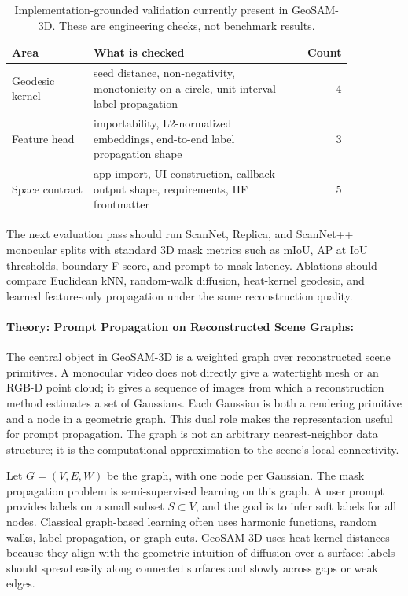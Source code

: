 \documentclass{article}
\begin{document}
\begin{table}[t]
\centering
\caption{Implementation-grounded validation currently present in GeoSAM-3D. These are engineering checks, not benchmark results.}
\label{tab:validation}
\begin{tabular}{@{}p{0.24\linewidth}p{0.62\linewidth}r@{}}
\toprule
\textbf{Area} & \textbf{What is checked} & \textbf{Count}\\
\midrule
Geodesic kernel & seed distance, non-negativity, monotonicity on a circle, unit interval label propagation & 4\\
Feature head & importability, L2-normalized embeddings, end-to-end label propagation shape & 3\\
Space contract & app import, UI construction, callback output shape, requirements, HF frontmatter & 5\\
\bottomrule
\end{tabular}
\end{table}

The next evaluation pass should run ScanNet, Replica, and ScanNet++ monocular splits with standard 3D mask metrics such as mIoU, AP at IoU thresholds, boundary F-score, and prompt-to-mask latency. Ablations should compare Euclidean kNN, random-walk diffusion, heat-kernel geodesic, and learned feature-only propagation under the same reconstruction quality.

\paragraph{Theory: Prompt Propagation on Reconstructed Scene Graphs:}

The central object in GeoSAM-3D is a weighted graph over reconstructed scene primitives. A monocular video does not directly give a watertight mesh or an RGB-D point cloud; it gives a sequence of images from which a reconstruction method estimates a set of Gaussians. Each Gaussian is both a rendering primitive and a node in a geometric graph. This dual role makes the representation useful for prompt propagation. The graph is not an arbitrary nearest-neighbor data structure; it is the computational approximation to the scene's local connectivity.

Let $G=(V,E,W)$ be the graph, with one node per Gaussian. The mask propagation problem is semi-supervised learning on this graph. A user prompt provides labels on a small subset $S\subset V$, and the goal is to infer soft labels for all nodes. Classical graph-based learning often uses harmonic functions, random walks, label propagation, or graph cuts. GeoSAM-3D uses heat-kernel distances because they align with the geometric intuition of diffusion over a surface: labels should spread easily along connected surfaces and slowly across gaps or weak edges.
\end{document}
